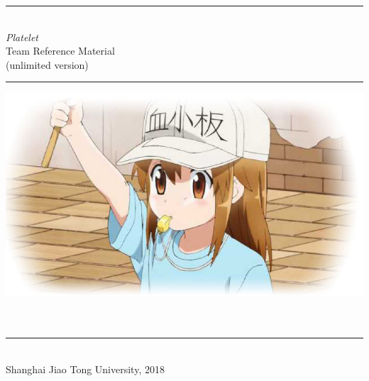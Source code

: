 \documentclass[titlepage, a4page, openany]{book}
\begin{document}
	\begin{titlepage}
		\centering
		\rule{\linewidth}{0.5mm}\\[0.4cm]
		\textit{\Huge Platelet}\\[\baselineskip]
		{\Large Team Reference Material}\\
		{\small (unlimited version)}\\[0.4cm]
		\rule{\linewidth}{0.5mm}
		\vfill
		\includegraphics[scale=0.4]{Platelet.jpg}
		\vfill
		\\[0.1cm]
		\\[0.1cm]
		\\[0.4cm]
		\rule{\linewidth}{0.3mm}\\[0.4cm]
		\small{Shanghai Jiao Tong University, 2018}
	\end{titlepage}
	\cleardoublepage
	\setcounter{page}{1}
	\tableofcontents
	\cleardoublepage
	\setcounter{page}{1}
	
	
	
	
	
	
\end{document}
